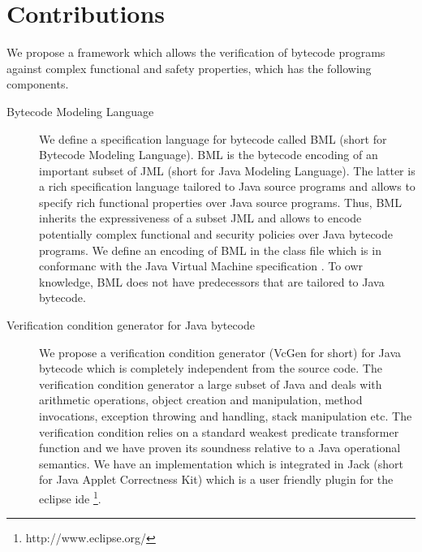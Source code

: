    \section{Contributions}
   We propose a framework which allows the verification of bytecode programs against complex
   functional and safety properties, which has the following 
   components.
\begin{description}
     \item [Bytecode Modeling Language] 
         


         We define a   specification language for bytecode called BML (short for Bytecode Modeling Language). 
	 BML is the bytecode encoding of an important subset of JML (short for Java Modeling Language). The latter is a rich specification
	 language tailored to Java source programs and allows to specify rich functional properties over Java source programs.
	 Thus, BML inherits the expressiveness of a subset JML and allows to encode potentially 
	 complex functional and security policies over Java bytecode programs.
	 We define an encoding of BML in the class file which is in conformanc with the Java Virtual Machine specification \cite{VMSpec}.
	 To owr knowledge, BML does not have predecessors that are tailored to Java bytecode.
 
   \item [Verification condition generator for Java bytecode]
	  We propose a verification condition generator (VcGen for short) for Java bytecode which is completely independent from 
	 the source code. The verification condition generator a large subset of Java and deals with
	 arithmetic operations, object creation and manipulation,
	 method invocations, exception throwing and handling, stack manipulation etc.
	 The verification condition relies on a standard weakest predicate transformer function and we
	 have proven its soundness relative to a Java operational semantics.
	 We have an implementation which is integrated in Jack (short for Java Applet Correctness Kit) \cite{BRL-JACK} which is a user friendly 
	 plugin for the eclipse ide \footnote{http://www.eclipse.org/}. 
	 

\end{description}
